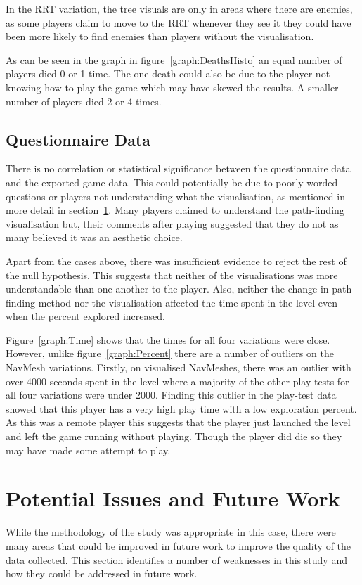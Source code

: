 \documentclass[journal]{IEEEtran}
\begin{document}
	In the RRT variation, the tree visuals are only in areas where there are enemies, as some players claim to move to the RRT whenever they see it they could have been more likely to find enemies than players without the visualisation.
	
	As can be seen in the graph in figure~\ref{graph:DeathsHisto} an equal number of players died 0 or 1 time. The one death could also be due to the player not knowing how to play the game which may have skewed the results. A smaller number of players died 2 or 4 times. 
	
	
	\subsection{Questionnaire Data}
	There is no correlation or statistical significance between the questionnaire data and the exported game data. This could potentially be due to poorly worded questions or players not understanding what the visualisation, as mentioned in more detail in section~\ref{PotentialIssues}. Many players claimed to understand the path-finding visualisation but, their comments after playing suggested that they do not as many believed it was an aesthetic choice.
	
	Apart from the cases above, there was insufficient evidence to reject the rest of the null hypothesis. This suggests that neither of the visualisations was more understandable than one another to the player. Also, neither the change in path-finding method nor the visualisation affected the time spent in the level even when the percent explored increased.
	
	Figure~\ref{graph:Time} shows that the times for all four variations were close. However, unlike figure~\ref{graph:Percent} there are a number of outliers on the NavMesh variations. Firstly, on visualised NavMeshes, there was an outlier with over 4000 seconds spent in the level where a majority of the other play-tests for all four variations were under 2000. Finding this outlier in the play-test data showed that this player has a very high play time with a low exploration percent. As this was a remote player this suggests that the player just launched the level and left the game running without playing. Though the player did die so they may have made some attempt to play.
	
	
	\section{Potential Issues and Future Work} \label{PotentialIssues}
	While the methodology of the study was appropriate in this case, there were many areas that could be improved in future work to improve the quality of the data collected. This section identifies a number of weaknesses in this study and how they could be addressed in future work. 
	
\end{document}
